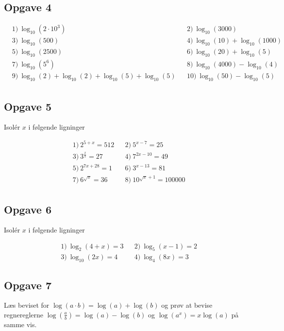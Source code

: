 \subsection*{Opgave 4}
\begin{align*}
	&1) \ \log_{10}(2\cdot 10^3) && 2) \ \log_{10}(3000) \\
	&3) \ \log_{10}(500)        && 4) \ \log_{10}(10) + \log_{10}(1000) \\
	&5) \  \log_{10}(2500)  &&6) \ \log_{10}(20)+ \log_{10}(5)   \\   
	&7) \  \log_{10}(5^6)  &&8) \ \log_{10}(4000) - \log_{10}(4)   \\   
	&9) \  \log_{10}(2)+\log_{10}(2)+\log_{10}(5) + \log_{10}(5)  &&10) \ \log_{10}(50)-\log_{10}(5)  \\ 
\end{align*}	

\subsection*{Opgave 5}

Isolér $x$ i følgende ligninger

\begin{align*}
	&1) \  2^{5+x} = 512 &    &2) \  5^{x-7} = 25 \\
	&3) \  3^{\frac{x}{2}} = 27 &    &4) \  7^{2x-10} = 49 \\
	&5) \  2^{7x+28} = 1 &    &6) \  3^{x-13} = 81 \\
	&7) \  6^{\sqrt{x}} = 36 &    &8) \  10^{\sqrt{x}+1} = 100000 \\
\end{align*}

\subsection*{Opgave 6}

Isolér $x$ i følgende ligninger

\begin{align*}
	&1) \  \log_2(4+x) = 3 &    &2) \  \log_5(x-1) = 2 \\
	&3) \  \log_{10}(2x) = 4 &    &4) \  \log_4(8x) = 3 
\end{align*}

\subsection*{Opgave 7}

Læs beviset for $\log(a\cdot b) = \log(a) + \log(b)$ og prøv at bevise regnereglerne $\log(\frac{a}{b}) =
\log(a)-\log(b)$ og $\log(a^x) = x\log(a)$ på samme vis. 